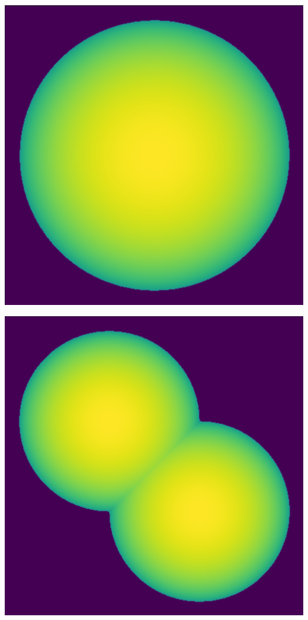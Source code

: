 \documentclass{article}
\begin{document}
\begin{center}
    \begin{minipage}{0.3\textwidth}
        \includegraphics*[width=\linewidth]{../images/sfera_singola.png}
    \end{minipage}
    \hfill
    \begin{minipage}{0.3\textwidth}
        \includegraphics*[width=\linewidth]{../images/sfera_doppia.png}

\end{minipage}
\end{center}
\end{document}
